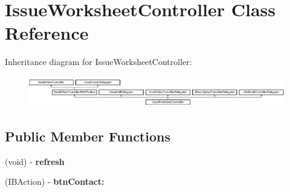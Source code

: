 \hypertarget{interface_issue_worksheet_controller}{
\section{IssueWorksheetController Class Reference}
\label{interface_issue_worksheet_controller}
}
Inheritance diagram for IssueWorksheetController:\begin{figure}[H]
\begin{center}
\leavevmode
\includegraphics[height=1.346154cm]{interface_issue_worksheet_controller}
\end{center}
\end{figure}
\subsection*{Public Member Functions}
\begin{DoxyCompactItemize}
\item 
\hypertarget{interface_issue_worksheet_controller_a5b3bf3248c6d32074934a81325500dde}{
(void) -\/ {\bfseries refresh}}
\label{interface_issue_worksheet_controller_a5b3bf3248c6d32074934a81325500dde}

\item 
\hypertarget{interface_issue_worksheet_controller_a60df818e693b415fc0e0bf9644f32497}{
(IBAction) -\/ {\bfseries btnContact:}}
\label{interface_issue_worksheet_controller_a60df818e693b415fc0e0bf9644f32497}

\end{DoxyCompactItemize}
